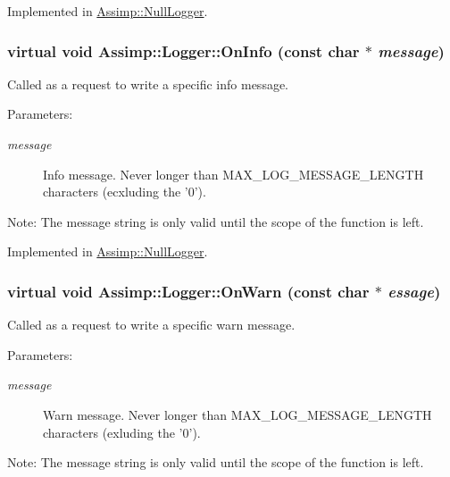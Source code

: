Implemented in \hyperlink{class_assimp_1_1_null_logger_f354ebbd382b7097a55d364794a45631}{Assimp::NullLogger}.\hypertarget{class_assimp_1_1_logger_ba81c4562ff8db83f06c6b62f2eb7983}{
\subsubsection[OnInfo]{\setlength{\rightskip}{0pt plus 5cm}virtual void Assimp::Logger::OnInfo (const char $\ast$ {\em message})}}
\label{class_assimp_1_1_logger_ba81c4562ff8db83f06c6b62f2eb7983}


Called as a request to write a specific info message. 

\begin{Desc}
\item[Parameters:]
\begin{description}
\item[{\em message}]Info message. Never longer than MAX\_\-LOG\_\-MESSAGE\_\-LENGTH characters (ecxluding the '0'). \end{description}
\end{Desc}
\begin{Desc}
\item[Note:]The message string is only valid until the scope of the function is left. \end{Desc}


Implemented in \hyperlink{class_assimp_1_1_null_logger_12d2b0048d17a819c8c00277ad1394c5}{Assimp::NullLogger}.\hypertarget{class_assimp_1_1_logger_b8066978dd37992f711d75d49cf4607b}{
\subsubsection[OnWarn]{\setlength{\rightskip}{0pt plus 5cm}virtual void Assimp::Logger::OnWarn (const char $\ast$ {\em essage})}}
\label{class_assimp_1_1_logger_b8066978dd37992f711d75d49cf4607b}


Called as a request to write a specific warn message. 

\begin{Desc}
\item[Parameters:]
\begin{description}
\item[{\em message}]Warn message. Never longer than MAX\_\-LOG\_\-MESSAGE\_\-LENGTH characters (exluding the '0'). \end{description}
\end{Desc}
\begin{Desc}
\item[Note:]The message string is only valid until the scope of the function is left. \end{Desc}


